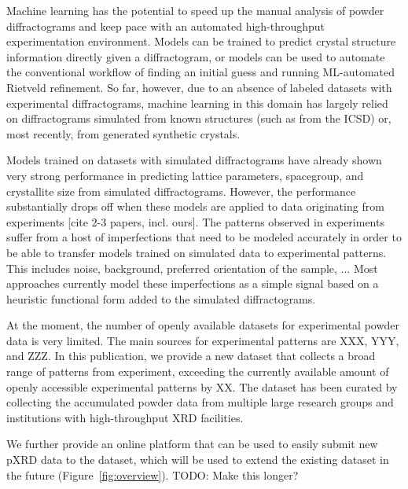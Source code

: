 Machine learning has the potential to speed up the manual analysis of powder diffractograms and keep pace with an automated high-throughput experimentation environment.
Models can be trained to predict crystal structure information directly given a diffractogram, or models can be used to automate the conventional workflow of finding an initial guess and running ML-automated Rietveld refinement.
So far, however, due to an absence of labeled datasets with experimental diffractograms, machine learning in this domain has largely relied on diffractograms simulated from known structures (such as from the ICSD) or, most recently, from generated synthetic crystals.

Models trained on datasets with simulated diffractograms have already shown very strong performance in predicting
lattice parameters, spacegroup, and crystallite size from simulated diffractograms.
However, the performance substantially drops off when these models are applied to data originating from experiments [cite 2-3 papers, incl. ours].
The patterns observed in experiments suffer from a host of imperfections that need to be modeled accurately in order to be able to transfer models trained on simulated data to experimental patterns. This includes noise, background, preferred orientation of the sample, ...
Most approaches currently model these imperfections as a simple signal based on a heuristic functional form added to the simulated diffractograms.

At the moment, the number of openly available datasets for experimental powder data is very limited.
The main sources for experimental patterns are XXX, YYY, and ZZZ.
In this publication, we provide a new dataset that collects a broad range of patterns from experiment, exceeding the currently available amount of openly accessible experimental patterns by XX.
The dataset has been curated by collecting the accumulated powder data from multiple large research groups and institutions with high-throughput XRD facilities.

We further provide an online platform that can be used to easily submit new pXRD data to the dataset, which will be used to extend the existing dataset in the future (Figure~\ref{fig:overview}).
TODO: Make this longer?

